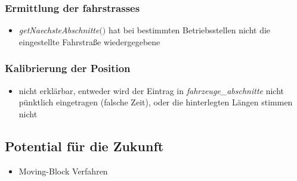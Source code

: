 \subsubsection{Ermittlung der \Glspl{fahrstrasse}}
\begin{itemize}
\item \textit{getNaechsteAbschnitte$($$)$} hat bei bestimmten Betriebsstellen nicht die eingestellte Fahrstraße wiedergegebene
\end{itemize}
\subsubsection{Kalibrierung der Position}
\begin{itemize}
\item nicht erklärbar, entweder wird der Eintrag in \textit{fahrzeuge\_abschnitte} nicht pünktlich eingetragen (falsche Zeit), oder die hinterlegten Längen stimmen nicht
\end{itemize}
\subsection{Potential für die Zukunft}
\begin{itemize}
\item Moving-Block Verfahren
\end{itemize}




















